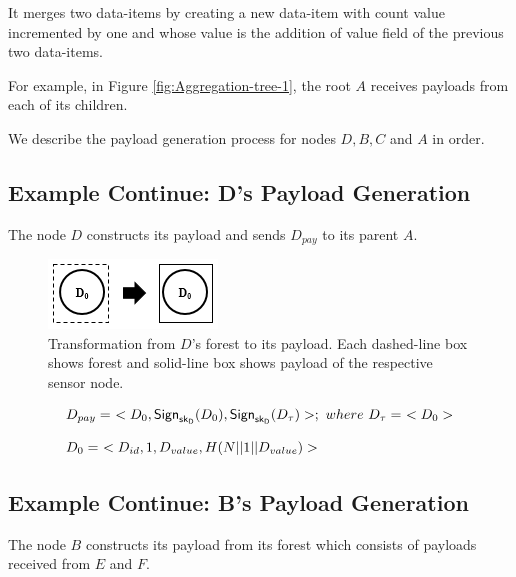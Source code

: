 \documentclass[%
  slidesonly,%
  semlayer%
  ]{seminar}                                  %
\newcommand{\sk}{\sf{sk}}
\begin{document}
\begin{slide}
      It merges two data-items by creating a new data-item with count value incremented by one and whose value is the addition of value field of the previous two data-items. 

      For example, in Figure \ref{fig:Aggregation-tree-1}, the root $A$ receives payloads from each of its children.
        
      We describe the payload generation process for nodes $D,B,C$ and $A$ in order.
      \vfill
      \clearpage

    \subsection*{Example Continue: D's Payload Generation}
      The node $D$ constructs its payload and sends $D_{pay}$ to its parent $A$.
      
      \begin{figure}[h!]
        \centering
        \includegraphics[scale = 0.5]{images/d-forest-payload.png}
        \caption{Transformation from $D$'s forest to its payload.
            Each dashed-line box shows forest and solid-line box shows payload of the respective sensor node.}
        \label{fig:d-forest-payload}
      \end{figure}
      \begin{equation*}
        \begin{array}{l}
          D_{pay} =\ <D_{0}, \textsf{Sign}_{\sk_{D}}(D_{0}), \textsf{Sign}_{\sk_{D}}(D_{\tau})>;\ where\ D_{\tau} =\ <D_{0}>\\
          \\
          D_{0} =\ <D_{id},1,D_{value},H(N||1||D_{value})>
        \end{array}
      \end{equation*}

      \vfill
      \clearpage

    \subsection*{Example Continue: B's Payload Generation}  
      The node $B$ constructs its payload from its forest which consists of payloads received from $E$ and $F$.


\end{slide}
\end{document}
